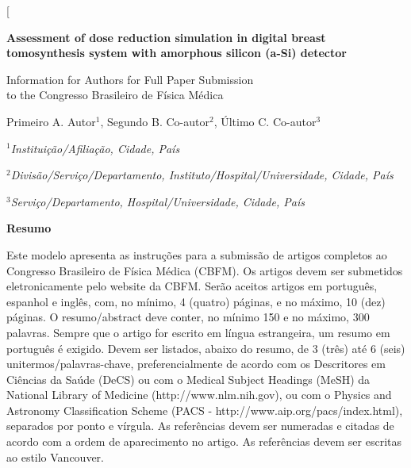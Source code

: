 \documentclass[10pt,twoside,twocolumn]{article}
\begin{document}
\twocolumn[\vspace{40pt}
  \begin{@twocolumnfalse}
  
    \begin{flushright}

        \Large{
        \textbf{Assessment of dose reduction simulation in digital breast tomosynthesis system with amorphous silicon (a-Si) detector}
        }
        
        \Large{
        Information for Authors for Full Paper Submission\\
        to the Congresso Brasileiro de F\'{i}sica M\'{e}dica
        }
        
        \vspace{\baselineskip}
        
        \large{
        Primeiro A. Autor$^{1}$, Segundo B. Co-autor$^{2}$, \'{U}ltimo C. Co-autor$^{3}$\\
        }
        
       \vspace{\baselineskip}
       
       \normalsize{
        
        $^{1}$\textit{Institui\c{c}\~{a}o/Afilia\c{c}\~{a}o, Cidade, Pa\'{i}s}
        
        $^{2}$\textit{Divis\~{a}o/Servi\c{c}o/Departamento, Instituto/Hospital/Universidade, Cidade, Pa\'{i}s}
        
        $^{3}$\textit{Servi\c{c}o/Departamento, Hospital/Universidade, Cidade, Pa\'{i}s}
        
        }

    \end{flushright}



\textbf{Resumo}

Este modelo apresenta as instruções para a submissão de artigos completos ao Congresso Brasileiro de Física Médica (CBFM). Os artigos devem ser submetidos eletronicamente pelo website da CBFM. Serão aceitos artigos em português, espanhol e inglês, com, no mínimo, 4 (quatro) páginas, e no máximo, 10 (dez) páginas. O resumo/abstract deve conter, no mínimo 150 e no máximo, 300 palavras. Sempre que o artigo for escrito em língua estrangeira, um resumo em português é exigido. Devem ser listados, abaixo do resumo, de 3 (três) até 6 (seis) unitermos/palavras-chave, preferencialmente de acordo com os Descritores em Ciências da Saúde (DeCS) ou com o Medical Subject Headings (MeSH) da National Library of Medicine (http://www.nlm.nih.gov), ou com o Physics and Astronomy Classification Scheme (PACS - http://www.aip.org/pacs/index.html), separados por ponto e vírgula. As referências devem ser numeradas e citadas de acordo com a ordem de aparecimento no artigo. As referências devem ser escritas ao estilo Vancouver.


\end{@twocolumnfalse}
\end{document}
